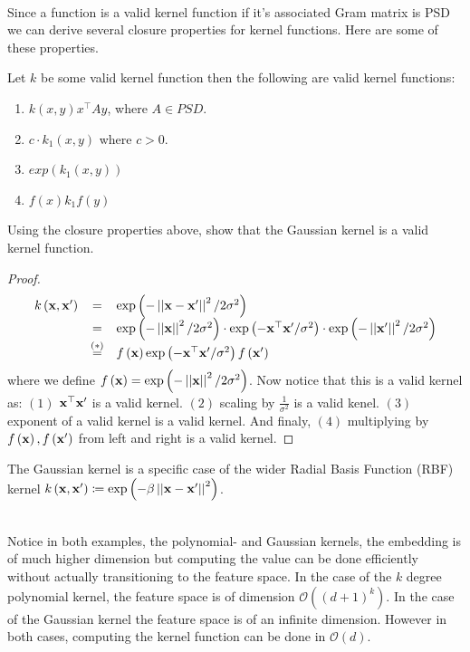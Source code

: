 ~\\Since a function is a valid kernel function if it's associated Gram matrix is PSD we can derive several closure properties for kernel functions. Here are some of these properties.
\begin{claim}
	Let $k$ be some valid kernel function then the following are valid kernel functions:
	\begin{enumerate}
		\item $k\left(x,y\right)x^\top A y$, where $A\in PSD$.
		\item $c\cdot k_1\left(x,y\right)$ where $c>0$.
		\item $exp\left(k_1\left(x,y\right)\right)$
		\item $f\left(x\right)k_1 f\left(y\right)$
	\end{enumerate}
\end{claim}
\begin{exercise}
	Using the closure properties above, show that the Gaussian kernel is a valid kernel function.
\end{exercise}
\begin{proof}
	$$
	\begin{array}{ccl}
		k\left(\mathbf{x},\mathbf{x}'\right) & = & \exp\left(-\left|\left| \mathbf{x}-\mathbf{x}'\right|\right|^2/2\sigma^2\right) \\
		& = & \exp\left(-\left|\left| \mathbf{x}\right|\right|^2/2\sigma^2\right) \cdot \exp\left(-\mathbf{x}^\top\mathbf{x}'/\sigma^2\right) \cdot \exp\left(-\left|\left| \mathbf{x}'\right|\right|^2/2\sigma^2\right) \\
		& \overset{\left(*\right)}{=} & f\left(\mathbf{x}\right) \exp\left(-\mathbf{x}^\top\mathbf{x}'/\sigma^2\right) f\left(\mathbf{x}'\right) 
	\end{array}
	$$
	where we define $f\left(\mathbf{x}\right) = \exp\left(-\left|\left| \mathbf{x}\right|\right|^2/2\sigma^2\right)$. Now notice that this is a valid kernel as: $\left(1\right)$ $\mathbf{x}^\top\mathbf{x}'$ is a valid kernel. $\left(2\right)$ scaling by $\frac{1}{\sigma^2}$ is a valid kenel. $\left(3\right)$ exponent of a valid kernel is a valid kernel. And finaly, $\left(4\right)$ multiplying by $f\left(\mathbf{x}\right), f\left(\mathbf{x}'\right)$ from left and right is a valid kernel.
\end{proof}

\begin{remark}
	The Gaussian kernel is a specific case of the wider Radial Basis Function (RBF) kernel $k\left(\mathbf{x},\mathbf{x}'\right)\coloneqq \exp\left(-\beta \left|\left| \mathbf{x}-\mathbf{x}'\right|\right|^2\right)$.
\end{remark}

~\\ Notice in both examples, the polynomial- and Gaussian kernels, the embedding is of much higher dimension but computing the value can be done efficiently without actually transitioning to the feature space. In the case of the $k$ degree polynomial kernel, the feature space is of dimension $\mathcal{O}\left(\left(d+1\right)^k\right)$. In the case of the Gaussian kernel the feature space is of an infinite dimension. However in both cases, computing the kernel function can be done in $\mathcal{O}\left(d\right)$.


